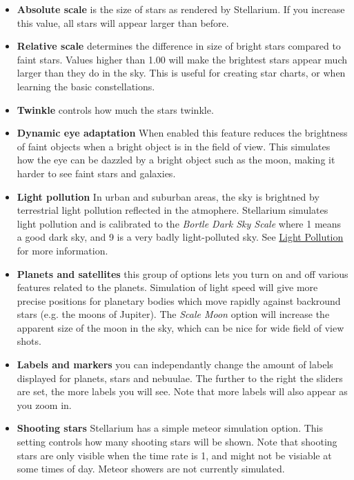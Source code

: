 \begin{itemize}
\item
  \textbf{Absolute scale} is the size of stars as rendered by
  Stellarium. If you increase this value, all stars will appear larger
  than before.
\item
  \textbf{Relative scale} determines the difference in size of bright
  stars compared to faint stars. Values higher than 1.00 will make the
  brightest stars appear much larger than they do in the sky. This is
  useful for creating star charts, or when learning the basic
  constellations.
\item
  \textbf{Twinkle} controls how much the stars twinkle.
\item
  \textbf{Dynamic eye adaptation} When enabled this feature reduces the
  brightness of faint objects when a bright object is in the field of
  view. This simulates how the eye can be dazzled by a bright object
  such as the moon, making it harder to see faint stars and galaxies.
\item
  \textbf{Light pollution} In urban and suburban areas, the sky is
  brightned by terrestrial light pollution reflected in the atmophere.
  Stellarium simulates light pollution and is calibrated to the
  \emph{Bortle Dark Sky Scale} where 1 means a good dark sky, and 9 is a
  very badly light-polluted sky. See
  \href{Advanced_Use\#Light_Pollution}{Light Pollution} for more
  information.
\item
  \textbf{Planets and satellites} this group of options lets you turn on
  and off various features related to the planets. Simulation of light
  speed will give more precise positions for planetary bodies which move
  rapidly against backround stars (e.g. the moons of Jupiter). The
  \emph{Scale Moon} option will increase the apparent size of the moon
  in the sky, which can be nice for wide field of view shots.
\item
  \textbf{Labels and markers} you can independantly change the amount of
  labels displayed for planets, stars and nebuulae. The further to the
  right the sliders are set, the more labels you will see. Note that
  more labels will also appear as you zoom in.
\item
  \textbf{Shooting stars} Stellarium has a simple meteor simulation
  option. This setting controls how many shooting stars will be shown.
  Note that shooting stars are only visible when the time rate is 1, and
  might not be visiable at some times of day. Meteor showers are not
  currently simulated.
\end{itemize}

